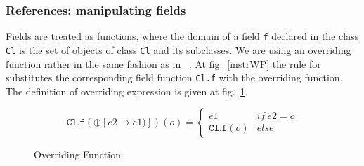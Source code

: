 \subsubsection{References: manipulating fields}
Fields are treated as functions, where the domain of a field \texttt{f} 
declared in the class \texttt{Cl} is the set of objects of class \texttt{Cl} and its subclasses.
We are using an overriding function rather in the same fashion as in ~\cite{B00ppp}. 
At fig.~\ref{instrWP} the rule for  substitutes the corresponding field function \texttt{Cl.f} with the overriding function. 
The definition of overriding expression is given at fig.~\ref{override}.

\begin{figure}
$$
 \texttt{Cl.f}(\oplus[e2 \rightarrow e1)])(o) = \left\{ \begin{array} {ll}
						       e1 & if \ e2 = o \\
					               \texttt{Cl.f}(o)	& else 
	\end{array}\right. 
$$ 
\caption{Overriding Function}
\label{override}
\end{figure}



